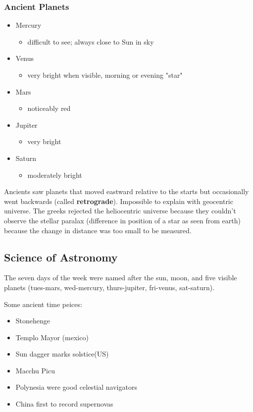 \documentclass[12pt]{article}
\begin{document}
\subsubsection{Ancient Planets}
\begin{itemize}
    \item Mercury
        \begin{itemize}
            \item difficult to see; always close to Sun in sky
         \end{itemize}
    \item Venus
        \begin{itemize}
            \item very bright when visible, morning or evening "star"
         \end{itemize}
    \item Mars
        \begin{itemize}
            \item noticeably red
         \end{itemize}
    \item Jupiter
        \begin{itemize}
            \item very bright
         \end{itemize}
    \item Saturn
        \begin{itemize}
            \item moderately bright
         \end{itemize}
\end{itemize}
Ancients saw planets that moved eastward relative to the starts but occasionally went backwards (called \textbf{retrograde}). Impossible to explain with geocentric universe. The greeks rejected the heliocentric universe because they couldn't observe the stellar paralax (difference in position of a star as seen from earth) because the change in distance was too small to be measured.

\subsection{Science of Astronomy}
The seven days of the week were named after the sun, moon, and five visible planets (tues-mars, wed-mercury, thurs-jupiter, fri-venus, sat-saturn).

Some ancient time peices:
\begin{itemize}
    \item Stonehenge
    \item Templo Mayor (mexico)
    \item Sun dagger marks solstice(US)
    \item Macchu Picu
    \item Polynesia were good celestial navigators
    \item China first to record supernovas
\end{itemize}
\end{document}
